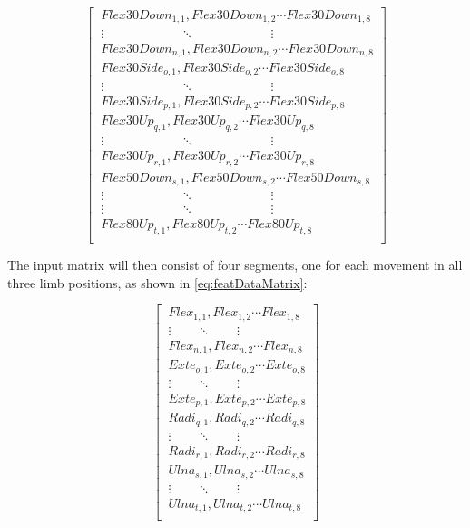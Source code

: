 \begin{equation} \label{eq:segMatrix}
\begin{bmatrix} 
\ Flex30Down_{1,1}, Flex30Down_{1,2} \cdots Flex30Down_{1,8} \\ 
\ \vdots \qquad \qquad \qquad \ddots \qquad \qquad \qquad \vdots \\
\ Flex30Down_{n,1}, Flex30Down_{n,2} \cdots Flex30Down_{n,8} \\
\ Flex30Side_{o,1}, Flex30Side_{o,2} \cdots Flex30Side_{o,8} \\
\ \vdots \qquad \qquad \qquad \ddots \qquad \qquad \qquad \vdots \\
\ Flex30Side_{p,1}, Flex30Side_{p,2} \cdots Flex30Side_{p,8} \\
\ Flex30Up_{q,1}, Flex30Up_{q,2} \cdots Flex30Up_{q,8} \\
\ \vdots \qquad \qquad \qquad \ddots \qquad \qquad \qquad \vdots \\
\ Flex30Up_{r,1}, Flex30Up_{r,2} \cdots Flex30Up_{r,8} \\
\ Flex50Down_{s,1}, Flex50Down_{s,2} \cdots Flex50Down_{s,8} \\
\ \vdots \qquad \qquad \qquad \ddots \qquad \qquad \qquad \vdots \\
\ \vdots \qquad \qquad \qquad \ddots \qquad \qquad \qquad \vdots \\
\ Flex80Up_{t,1}, Flex80Up_{t,2} \cdots Flex80Up_{t,8} \\
\end{bmatrix}
\end{equation}

The input matrix will then consist of four segments, one for each movement in all three limb positions, as shown in \ref{eq:featDataMatrix}:

\begin{equation} \label{eq:featDataMatrix}
\begin{bmatrix} 
\ Flex_{1,1}, Flex_{1,2} \cdots Flex_{1,8} \\ 
\ \vdots \qquad \ddots \qquad \vdots \\
\ Flex_{n,1}, Flex_{n,2} \cdots Flex_{n,8} \\
\ Exte_{o,1}, Exte_{o,2} \cdots Exte_{o,8} \\
\ \vdots \qquad \ddots \qquad \vdots \\
\ Exte_{p,1}, Exte_{p,2} \cdots Exte_{p,8} \\
\ Radi_{q,1}, Radi_{q,2} \cdots Radi_{q,8} \\
\ \vdots \qquad \ddots \qquad \vdots \\
\ Radi_{r,1}, Radi_{r,2} \cdots Radi_{r,8} \\
\ Ulna_{s,1}, Ulna_{s,2} \cdots Ulna_{s,8} \\
\ \vdots \qquad \ddots \qquad \vdots \\
\ Ulna_{t,1}, Ulna_{t,2} \cdots Ulna_{t,8} \\
\end{bmatrix}
\end{equation}

